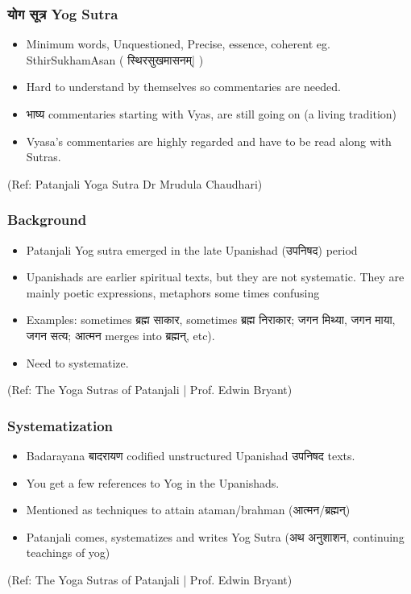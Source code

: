 \begin{frame}[fragile]\frametitle{ योग सूत्र Yog Sutra}

	\begin{itemize}
	\item Minimum words, Unquestioned, Precise, essence, coherent eg. SthirSukhamAsan ( स्थिरसुखमासनम्| )
	\item Hard to understand by themselves so commentaries are needed.
	\item भाष्य commentaries starting with Vyas, are still going on (a living tradition)
	\item Vyasa's commentaries are highly regarded and have to be read along with Sutras.
	\end{itemize}

\tiny{(Ref: Patanjali Yoga Sutra Dr Mrudula Chaudhari)}

\end{frame}



\begin{frame}[fragile]\frametitle{Background}

	\begin{itemize}
	\item Patanjali Yog sutra emerged in the late Upanishad (उपनिषद) period
	\item Upanishads are earlier spiritual texts, but they are not systematic. They are mainly poetic expressions, metaphors some times confusing
	\item Examples: sometimes ब्रह्म साकार, sometimes ब्रह्म निराकार; जगन मिथ्या, जगन माया, जगन सत्य; आत्मन merges into ब्रह्मन्, etc). 
	\item Need to systematize.
	\end{itemize}

\tiny{(Ref: The Yoga Sutras of Patanjali | Prof. Edwin Bryant)}

\end{frame}

\begin{frame}[fragile]\frametitle{Systematization}

	\begin{itemize}
	\item Badarayana बादरायण codified unstructured Upanishad  उपनिषद texts.
	\item You get a few references to Yog in the Upanishads.
	\item Mentioned as techniques to attain ataman/brahman (आत्मन/ब्रह्मन्)
	\item Patanjali comes, systematizes and writes Yog Sutra (अथ अनुशाशन, continuing teachings of yog)
	\end{itemize}

\tiny{(Ref: The Yoga Sutras of Patanjali | Prof. Edwin Bryant)}

\end{frame}


